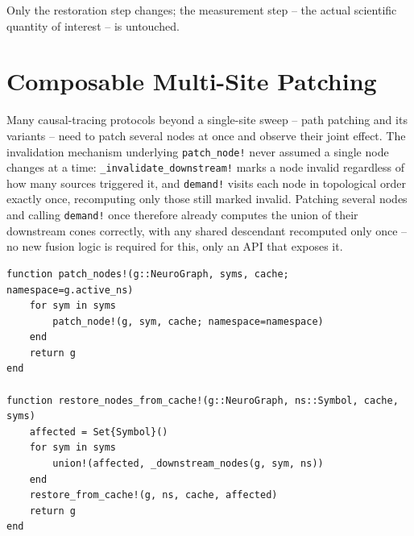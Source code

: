 \documentclass{article}
\begin{document}
Only the restoration step changes; the measurement step -- the actual scientific quantity of
interest -- is untouched.

\section{Composable Multi-Site Patching}
\label{sec:composable}

Many causal-tracing protocols beyond a single-site sweep -- path patching and its variants --
need to patch several nodes at once and observe their joint effect. The invalidation mechanism
underlying \texttt{patch\_node!} never assumed a single node changes at a time:
\texttt{\_invalidate\_downstream!} marks a node invalid regardless of how many sources triggered
it, and \texttt{demand!} visits each node in topological order exactly once, recomputing only
those still marked invalid. Patching several nodes and calling \texttt{demand!} once therefore
already computes the union of their downstream cones correctly, with any shared descendant
recomputed only once -- no new fusion logic is required for this, only an API that exposes it.

\begin{lstlisting}[caption={\texttt{patch\_nodes!} and \texttt{restore\_nodes\_from\_cache!} (\texttt{src/patching.jl})},label={lst:multipatch}]
function patch_nodes!(g::NeuroGraph, syms, cache; namespace=g.active_ns)
    for sym in syms
        patch_node!(g, sym, cache; namespace=namespace)
    end
    return g
end

function restore_nodes_from_cache!(g::NeuroGraph, ns::Symbol, cache, syms)
    affected = Set{Symbol}()
    for sym in syms
        union!(affected, _downstream_nodes(g, sym, ns))
    end
    restore_from_cache!(g, ns, cache, affected)
    return g
end
\end{lstlisting}
\end{document}
